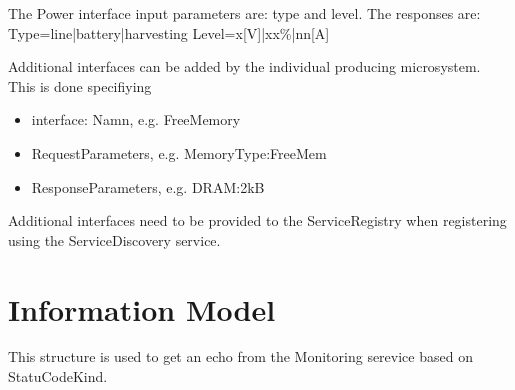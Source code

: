 \documentclass[a4paper]{arrowhead}
\begin{document}

The Power interface input parameters are: type and level.
The responses are:
Type=line|battery|harvesting
Level=x[V]|xx\%|nn[A]



Additional interfaces can be added by the individual producing
microsystem. This is done specifiying
\begin{itemize}
  
\item interface: Namn, e.g. FreeMemory
\item RequestParameters, e.g. MemoryType:FreeMem
\item ResponseParameters, e.g. DRAM:2kB
\end{itemize}  

Additional interfaces need to be provided to the ServiceRegistry when
registering using the ServiceDiscovery service.  


\section{Information Model}
\label{sec:model}






This structure is used to get an echo from the Monitoring serevice
based on StatuCodeKind.
 
\end{document}
